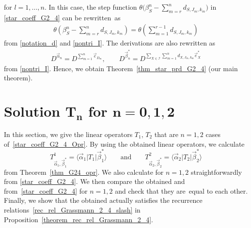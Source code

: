 \documentclass[pdftex]{sigma}
\numberwithin{equation}{section}
\begin{document}
for $l=1,\dots,n$.
In this case, the step function
$
 \theta
 \bigl(
 \beta_{S}^{n}
 -
 \sum_{m=r}^{n}
 d_{S,J_{m},k_{m}}
 \bigr)
$
in \eqref{star_coeff_G2_4} can be rewritten~as
\begin{align*}
 \theta
 \left(
 \beta_{S}^{n}
 -
 \sum_{m=r}^{n}
 d_{S,J_{m},k_{m}}
 \right)
 =
 \theta
 \left(
 \sum_{m=1}^{r-1}
 d_{
 S,
 J_{m},
 k_{m}
 }
 \right)
\end{align*}
from \eqref{notation_d} and \eqref{nontri_I}.
The derivations are also rewritten as
\begin{align*}
 D^{\vec{\alpha}_{n}}
 =
 D^{
 \sum_{m=1}^{n}
 \vec{e}_{D_{m}}
 },
 \qquad
 D^{\vec{\beta}_{n}^{\ast}}
 =
 D^{
 \sum_{
 X
 \in
 \mathcal{I}
 }
 \sum_{m=1}^{n}
 d_{
 X,
 J_{m},
 k_{m}
 }
 \vec{e}_{X}^{\ast}
 }
\end{align*}
from \eqref{nontri_I}. Hence, we obtain Theorem~\ref{thm_star_prd_G2_4} (our main theorem).

\section[Solution T\_n for n=0,1,2]{Solution $\boldsymbol{T_{n}}$ for $\boldsymbol{n=0,1,2}$}
\label{G24_sol_n012}

In this section, we give the linear operators
$T_{1}$, $T_{2}$
that are $n=1,2$ cases of~\eqref{star_coeff_G2_4_Opr}. By using the obtained linear operators, we calculate
\[
T^{1}_{\vec{\alpha}_{1},\vec{\beta}_{1}^{\ast}}
=
\langle
\vec{\alpha}_{1}
|
T_{1}
|
\vec{\beta}_{1}^{\ast}
\rangle
\qquad \text{and} \qquad
T^{2}_{\vec{\alpha}_{2},\vec{\beta}_{2}^{\ast}}
=
\langle
\vec{\alpha}_{2}
|
T_{2}
|
\vec{\beta}_{2}^{\ast}
\rangle
\]
from Theorem~\ref{thm_G24_opr}. We also calculate  for $n=1,2$ straightforwardly from \eqref{star_coeff_G2_4}. We then compare the obtained
and
 from~\eqref{star_coeff_G2_4}
for $n=1,2$ and check that they are~equal to each other. Finally, we show that the obtained  actually satisfies the recurrence relations~\eqref{rec_rel_Grassmann_2_4_slash} in
Proposition~\ref{theorem_rec_rel_Grassmann_2_4}.
\end{document}
